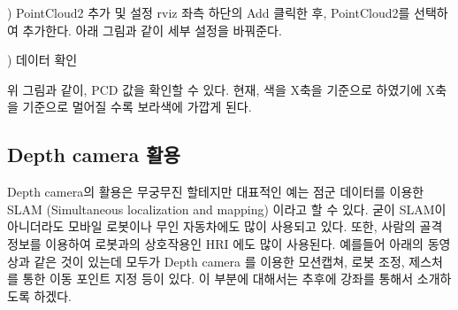 \vspace{\baselineskip}
\noindent
{}) PointCloud2 추가 및 설정
rviz 좌측 하단의 Add 클릭한 후, PointCloud2를 선택하여 추가한다. 아래 그림과 같이 세부 설정을 바꿔준다.

\vspace{\baselineskip}
\noindent
{}
\thenum) 데이터 확인

위 그림과 같이, PCD 값을 확인할 수 있다. 현재, 색을 X축을 기준으로 하였기에 X축을 기준으로 멀어질 수록 보라색에 가깝게 된다.

\subsection{Depth camera 활용}

Depth camera의 활용은 무궁무진 할테지만 대표적인 예는 점군 데이터를 이용한 SLAM (Simultaneous localization and mapping) 이라고 할 수 있다. 굳이 SLAM이 아니더라도 모바일 로봇이나 무인 자동차에도 많이 사용되고 있다. 또한, 사람의 골격 정보를 이용하여 로봇과의 상호작용인 HRI 에도 많이 사용된다. 예를들어 아래의 동영상과 같은 것이 있는데 모두가 Depth camera 를 이용한 모션캡쳐, 로봇 조정, 제스처를 통한 이동 포인트 지정 등이 있다. 이 부분에 대해서는 추후에 강좌를 통해서 소개하도록 하겠다.






